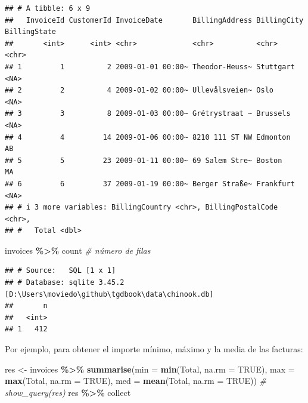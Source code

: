 \documentclass[
]{book}
\newenvironment{Shaded}{\begin{snugshade}}{\end{snugshade}}
\newcommand{\AttributeTok}[1]{\textcolor[rgb]{0.13,0.29,0.53}{#1}}
\newcommand{\CommentTok}[1]{\textcolor[rgb]{0.56,0.35,0.01}{\textit{#1}}}
\newcommand{\ConstantTok}[1]{\textcolor[rgb]{0.56,0.35,0.01}{#1}}
\newcommand{\FunctionTok}[1]{\textcolor[rgb]{0.13,0.29,0.53}{\textbf{#1}}}
\newcommand{\NormalTok}[1]{#1}
\newcommand{\OtherTok}[1]{\textcolor[rgb]{0.56,0.35,0.01}{#1}}
\newcommand{\SpecialCharTok}[1]{\textcolor[rgb]{0.81,0.36,0.00}{\textbf{#1}}}
\begin{document}
\begin{verbatim}
## # A tibble: 6 x 9
##   InvoiceId CustomerId InvoiceDate       BillingAddress BillingCity BillingState
##       <int>      <int> <chr>             <chr>          <chr>       <chr>       
## 1         1          2 2009-01-01 00:00~ Theodor-Heuss~ Stuttgart   <NA>        
## 2         2          4 2009-01-02 00:00~ Ullevålsveien~ Oslo        <NA>        
## 3         3          8 2009-01-03 00:00~ Grétrystraat ~ Brussels    <NA>        
## 4         4         14 2009-01-06 00:00~ 8210 111 ST NW Edmonton    AB          
## 5         5         23 2009-01-11 00:00~ 69 Salem Stre~ Boston      MA          
## 6         6         37 2009-01-19 00:00~ Berger Straße~ Frankfurt   <NA>        
## # i 3 more variables: BillingCountry <chr>, BillingPostalCode <chr>,
## #   Total <dbl>
\end{verbatim}

\begin{Shaded}
\begin{Highlighting}[]
\NormalTok{invoices }\SpecialCharTok{\%\textgreater{}\%}\NormalTok{ count }\CommentTok{\# número de filas}
\end{Highlighting}
\end{Shaded}

\begin{verbatim}
## # Source:   SQL [1 x 1]
## # Database: sqlite 3.45.2 [D:\Users\moviedo\github\tgdbook\data\chinook.db]
##       n
##   <int>
## 1   412
\end{verbatim}

Por ejemplo, para obtener el importe mínimo, máximo y la media de las facturas:

\begin{Shaded}
\begin{Highlighting}[]
\NormalTok{res }\OtherTok{\textless{}{-}}\NormalTok{ invoices }\SpecialCharTok{\%\textgreater{}\%} \FunctionTok{summarise}\NormalTok{(}\AttributeTok{min =} \FunctionTok{min}\NormalTok{(Total, }\AttributeTok{na.rm =} \ConstantTok{TRUE}\NormalTok{), }
                        \AttributeTok{max =} \FunctionTok{max}\NormalTok{(Total, }\AttributeTok{na.rm =} \ConstantTok{TRUE}\NormalTok{), }
                        \AttributeTok{med =} \FunctionTok{mean}\NormalTok{(Total, }\AttributeTok{na.rm =} \ConstantTok{TRUE}\NormalTok{))}
\CommentTok{\# show\_query(res)}
\NormalTok{res  }\SpecialCharTok{\%\textgreater{}\%}\NormalTok{ collect}
\end{Highlighting}
\end{Shaded}
\end{document}
